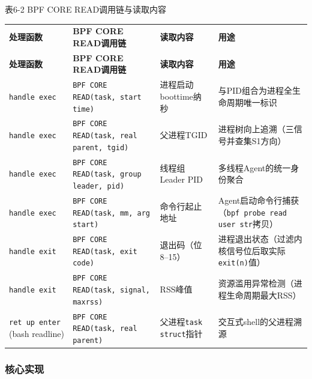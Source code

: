 \documentclass[a4paper]{ctexart}
\makeatletter
\renewcommand{\_}{%
  \ifmmode
    \nfss@text{\textunderscore}%
  \else
    \textunderscore\discretionary{}{}{}%
  \fi}
\makeatother
\begin{document}
\medskip
{\centering\small
表6-2 BPF\_CORE\_READ调用链与读取内容\par
\vspace{3pt}
\setlength{\tabcolsep}{6pt}
\renewcommand{\arraystretch}{1.1}
\begin{longtable}{>{\raggedright\arraybackslash}p{3.3cm} >{\raggedright\arraybackslash}p{3.3cm} >{\raggedright\arraybackslash}p{3.3cm} >{\raggedright\arraybackslash}p{3.3cm}}
\hline
\textbf{处理函数} & \textbf{BPF\_CORE\_READ调用链} & \textbf{读取内容} & \textbf{用途} \\*
\hline
\endfirsthead
\hline
\textbf{处理函数} & \textbf{BPF\_CORE\_READ调用链} & \textbf{读取内容} & \textbf{用途} \\
\hline
\endhead
\hline
\endfoot
\hline
\endlastfoot
\texttt{handle\_exec} & \texttt{BPF\_CORE\_READ(task, start\_time)} & 进程启动boottime纳秒 & 与PID组合为进程全生命周期唯一标识 \\*
\hline
\texttt{handle\_exec} & \texttt{BPF\_CORE\_READ(task, real\_parent, tgid)} & 父进程TGID & 进程树向上追溯（三信号并查集S1方向） \\
\hline
\texttt{handle\_exec} & \texttt{BPF\_CORE\_READ(task, group\_leader, pid)} & 线程组Leader PID & 多线程Agent的统一身份聚合 \\
\hline
\texttt{handle\_exec} & \texttt{BPF\_CORE\_READ(task, mm, arg\_start)} & 命令行起止地址 & Agent启动命令行捕获（\texttt{bpf\_probe\_read\_user\_str}拷贝） \\
\hline
\texttt{handle\_exit} & \texttt{BPF\_CORE\_READ(task, exit\_code)} & 退出码（位8--15） & 进程退出状态（过滤内核信号位后取实际\texttt{exit(n)}值） \\
\hline
\texttt{handle\_exit} & \texttt{BPF\_CORE\_READ(task, signal, maxrss)} & RSS峰值 & 资源滥用异常检测（进程生命周期最大RSS） \\
\hline
\texttt{ret\_up\_enter} (bash readline) & \texttt{BPF\_CORE\_READ(task, real\_parent)} & 父进程\texttt{task\_struct}指针 & 交互式shell的父进程溯源 \\
\hline
\end{longtable}
\par}


\subsubsection{核心实现}
\end{document}

